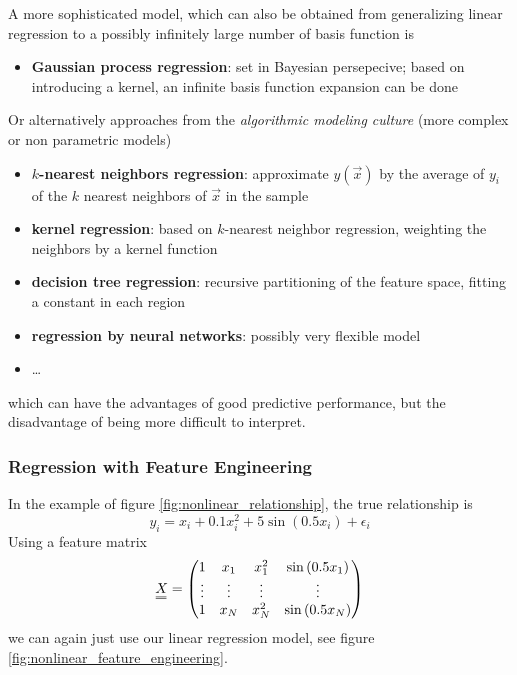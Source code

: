 A more sophisticated model, which can also be obtained from generalizing linear regression
to a possibly infinitely large number of basis function is

\begin{itemize}
    \item \textbf{Gaussian process regression}: set in Bayesian persepecive; based on introducing a kernel, an infinite basis function expansion can be done
\end{itemize}

Or alternatively approaches from the \textit{algorithmic modeling culture} (more complex or
non parametric models)

\begin{itemize}
    \item \textbf{$k$-nearest neighbors regression}: approximate $y(\vec{x})$ by the average of $y_i$ of the $k$ nearest neighbors of $\vec{x}$ in the sample
    \item \textbf{kernel regression}: based on $k$-nearest neighbor regression, weighting the neighbors by a kernel function
    \item \textbf{decision tree regression}: recursive partitioning of the feature space, fitting a constant in each region
    \item \textbf{regression by neural networks}: possibly very flexible model
    \item \dots
\end{itemize}

which can have the advantages of \textcolor{green1}{good predictive performance}, but the disadvantage of
being \textcolor{red1}{more difficult to interpret}.

\subsubsection{Regression with Feature Engineering}
In the example of figure \ref{fig:nonlinear_relationship}, the true relationship is
\begin{equation}
    y_i = x_i + 0.1 x_i^2 + 5 \sin{(0.5 x_i)} + \epsilon_i
\end{equation}
Using a feature matrix
\begin{equation}
    \mat{X} = \begin{pmatrix}
        1 & x_1 & x_1^2 & \sin{(0.5 x_1)} \\
        \vdots & \vdots & \vdots & \vdots \\
        1 & x_N & x_N^2 & \sin{(0.5 x_N)}
    \end{pmatrix}
\end{equation}
we can again just use our linear regression model,
see figure \ref{fig:nonlinear_feature_engineering}.

